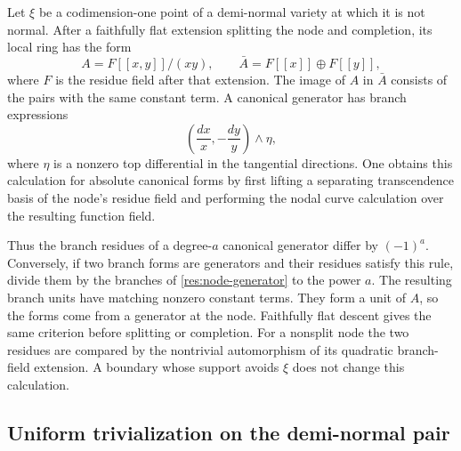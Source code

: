 Let $\xi$ be a codimension-one point of a demi-normal variety at which
it is not normal.  After a faithfully flat extension splitting the node
and completion, its local ring has the form
\[
 A=F[[x,y]]/(xy),\qquad
 \bar A=F[[x]]\oplus F[[y]],
\]
where $F$ is the residue field after that extension.  The image of $A$
in $\bar A$ consists of the pairs with the same constant term.  A
canonical generator has branch expressions
\begin{equation}\label{res:node-generator}
 \left(\frac{dx}{x},-\frac{dy}{y}\right)\wedge\eta,
\end{equation}
where $\eta$ is a nonzero top differential in the tangential directions.
One obtains this calculation for absolute canonical forms by first
lifting a separating transcendence basis of the node's residue field
and performing the nodal curve calculation over the resulting function
field.

Thus the branch residues of a degree-$a$ canonical generator differ by
$(-1)^a$.  Conversely, if two branch forms are generators and their
residues satisfy this rule, divide them by the branches of
\eqref{res:node-generator} to the power $a$.  The resulting branch
units have matching nonzero constant terms.  They form a unit of $A$,
so the forms come from a generator at the node.  Faithfully flat
descent gives the same criterion before splitting or completion.  For
a nonsplit node the two residues are compared by the nontrivial
automorphism of its quadratic branch-field extension.  A boundary
whose support avoids $\xi$ does not change this calculation.

\subsection{Uniform trivialization on the demi-normal pair}

